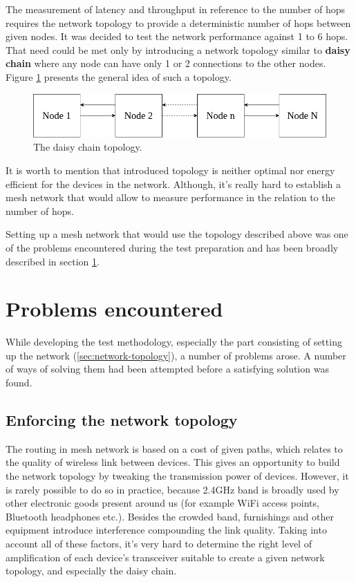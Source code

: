 The measurement of latency and throughput in reference to the number of hops requires the network topology
to provide a deterministic number of hops between given nodes. It was decided to test the network performance
against 1 to 6 hops. That need could be met only by introducing a network topology similar to \textbf{daisy 
chain} where any node can have only 1 or 2 connections to the other nodes. Figure \ref{fig:daisy_chain} 
presents the general idea of such a topology.

\medskip
\begin{figure}[H]
    \centering
    \includegraphics[scale=0.6]{images/daisy-chain.png}
    \caption{The daisy chain topology.}
    \label{fig:daisy_chain}
\end{figure}

It is worth to mention that introduced topology is neither optimal nor energy 
efficient for the devices in the network. Although, it's really hard to 
establish a mesh network that would allow to measure performance in the relation
to the number of hops. 

Setting up a mesh network that would use the topology described above was one
of the problems encountered during the test preparation and has been broadly
described in section \ref{sec:problems-encountered}.

\medskip
\section{Problems encountered}
\label{sec:problems-encountered}

While developing the test methodology, especially the part consisting of
setting up the network (\ref{sec:network-topology}), a number of problems 
arose. A number of ways of solving them had been attempted before a satisfying 
solution was found.

\subsection{Enforcing the network topology}

The
routing in mesh network is based on a cost of given paths, which 
relates to the quality of wireless link between devices. This gives an 
opportunity to build the network topology by tweaking the transmission power
of devices. However, it is rarely possible to do so in practice, because 2.4GHz 
band is broadly used by other electronic goods present around us (for example 
WiFi access points, Bluetooth headphones etc.). Besides the crowded band, 
furnishings and other equipment introduce interference compounding the link
quality. Taking into account all of these factors, it's very hard to determine
the right level of amplification of each device's transceiver suitable to create
a given network topology, and especially the daisy chain.

